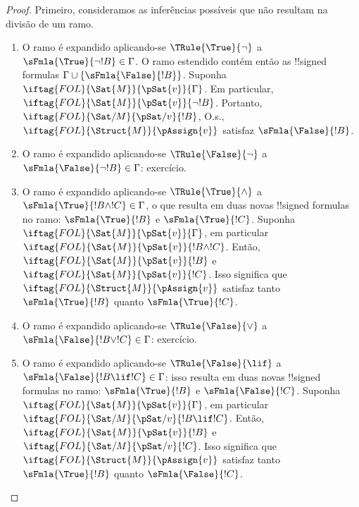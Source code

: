 \documentclass[../../../include/open-logic-section]{subfiles}
\begin{document}
\begin{proof}
Primeiro, consideramos as inferências possíveis que não resultam na divisão de um ramo.
\begin{enumerate}
\item O ramo é expandido aplicando-se $\TRule{\True}{\lnot}$ a
  $\sFmla{\True}{\lnot !B} \in \Gamma$. O ramo estendido
  contém então as !!{signed formula}s $\Gamma \cup
  \{\sFmla{\False}{!B}\}$. Suponha
  $\iftag{FOL}{\Sat{M}}{\pSat{v}}{\Gamma}$. Em particular,
  $\iftag{FOL}{\Sat{M}}{\pSat{v}}{\lnot !B}$. Portanto,
  $\iftag{FOL}{\Sat/{M}}{\pSat/{v}}{!B}$, O.s.\@,
  $\iftag{FOL}{\Struct{M}}{\pAssign{v}}$ satisfaz
  $\sFmla{\False}{!B}$.
\item O ramo é expandido aplicando-se $\TRule{\False}{\lnot}$ a
  $\sFmla{\False}{\lnot !B} \in \Gamma$: exercício.
\item O ramo é expandido aplicando-se $\TRule{\True}{\land}$ a
  $\sFmla{\True}{!B \land !C} \in \Gamma$, o que resulta em duas novas
  !!{signed formula}s no ramo: $\sFmla{\True}{!B}$ e
  $\sFmla{\True}{!C}$. Suponha
  $\iftag{FOL}{\Sat{M}}{\pSat{v}}{\Gamma}$, em particular
  $\iftag{FOL}{\Sat{M}}{\pSat{v}}{!B \land !C}$. Então,
  $\iftag{FOL}{\Sat{M}}{\pSat{v}}{!B}$ e
  $\iftag{FOL}{\Sat{M}}{\pSat{v}}{!C}$. Isso significa que
  $\iftag{FOL}{\Struct{M}}{\pAssign{v}}$ satisfaz tanto
  $\sFmla{\True}{!B}$ quanto $\sFmla{\True}{!C}$.
\item O ramo é expandido aplicando-se $\TRule{\False}{\lor}$ a
  $\sFmla{\False}{!B \lor !C} \in \Gamma$: exercício.
\item O ramo é expandido aplicando-se $\TRule{\False}{\lif}$ a
  $\sFmla{\False}{!B \lif !C} \in \Gamma$: isso resulta em duas novas
  !!{signed formula}s no ramo: $\sFmla{\True}{!B}$ e
  $\sFmla{\False}{!C}$. Suponha
  $\iftag{FOL}{\Sat{M}}{\pSat{v}}{\Gamma}$, em particular
  $\iftag{FOL}{\Sat/{M}}{\pSat/{v}}{!B \lif !C}$. Então,
  $\iftag{FOL}{\Sat{M}}{\pSat{v}}{!B}$ e
  $\iftag{FOL}{\Sat/{M}}{\pSat/{v}}{!C}$. Isso significa que
  $\iftag{FOL}{\Struct{M}}{\pAssign{v}}$ satisfaz tanto
  $\sFmla{\True}{!B}$ quanto $\sFmla{\False}{!C}$.

\end{enumerate}
\end{proof}
\end{document}
